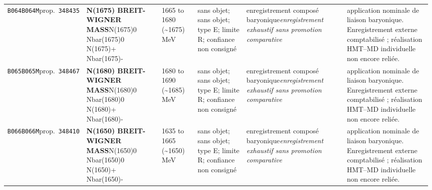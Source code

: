 \begin{landscape}
\begin{longtable}{L{1.85cm}L{4.45cm}L{2.35cm}L{4.05cm}L{3.35cm}L{7.15cm}}
\texttt{B064}\newline \texttt{B064M}\newline prop.\ \texttt{348435} & \textbf{N(1675) BREIT-WIGNER MASS}\newline N(1675)0 \textbar{}\allowbreak{} Nbar(1675)0 \textbar{}\allowbreak{} N(1675)+ \textbar{}\allowbreak{} Nbar(1675)- & 1665 to 1680 (\textasciitilde{}1675)\,MeV & sans objet; sans objet; type E; limite R; confiance non consigné & enregistrement composé baryonique\newline \emph{enregistrement exhaustif sans promotion comparative} & application nominale de liaison baryonique. Enregistrement externe comptabilisé ; réalisation HMT--MD individuelle non encore reliée. \\
\texttt{B065}\newline \texttt{B065M}\newline prop.\ \texttt{348467} & \textbf{N(1680) BREIT-WIGNER MASS}\newline N(1680)0 \textbar{}\allowbreak{} Nbar(1680)0 \textbar{}\allowbreak{} N(1680)+ \textbar{}\allowbreak{} Nbar(1680)- & 1680 to 1690 (\textasciitilde{}1685)\,MeV & sans objet; sans objet; type E; limite R; confiance non consigné & enregistrement composé baryonique\newline \emph{enregistrement exhaustif sans promotion comparative} & application nominale de liaison baryonique. Enregistrement externe comptabilisé ; réalisation HMT--MD individuelle non encore reliée. \\
\texttt{B066}\newline \texttt{B066M}\newline prop.\ \texttt{348410} & \textbf{N(1650) BREIT-WIGNER MASS}\newline N(1650)0 \textbar{}\allowbreak{} Nbar(1650)0 \textbar{}\allowbreak{} N(1650)+ \textbar{}\allowbreak{} Nbar(1650)- & 1635 to 1665 (\textasciitilde{}1650)\,MeV & sans objet; sans objet; type E; limite R; confiance non consigné & enregistrement composé baryonique\newline \emph{enregistrement exhaustif sans promotion comparative} & application nominale de liaison baryonique. Enregistrement externe comptabilisé ; réalisation HMT--MD individuelle non encore reliée. \\

\end{longtable}
\end{landscape}
